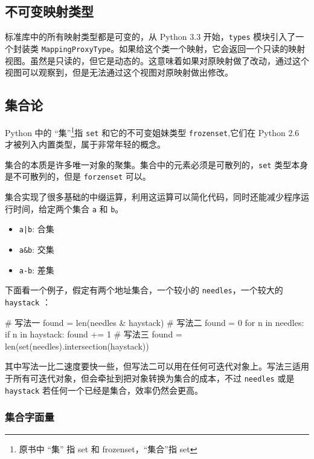 \subsection{不可变映射类型}

标准库中的所有映射类型都是可变的，从 Python 3.3 开始，\texttt{types} 模块引入了一个封装类 \texttt{MappingProxyType}。如果给这个类一个映射，它会返回一个只读的映射视图。虽然是只读的，但它是动态的。这意味着如果对原映射做了改动，通过这个视图可以观察到，但是无法通过这个视图对原映射做出修改。



\subsection{集合论}

Python 中的 ``集''\footnote{原书中 ``集'' 指 set 和 frozenset，``集合''指 set}指 \texttt{set} 和它的不可变姐妹类型 \texttt{frozenset},它们在 Python 2.6 才被列入内置类型，属于非常年轻的概念。

集合的本质是许多唯一对象的聚集。集合中的元素必须是可散列的，\texttt{set} 类型本身是不可散列的，但是 \texttt{forzenset} 可以。

集合实现了很多基础的中缀运算，利用这运算可以简化代码，同时还能减少程序运行时间，给定两个集合 \texttt{a} 和 \texttt{b}。
\begin{itemize}
    \item \texttt{a|b}: 合集
    \item \texttt{a\&b}: 交集
    \item \texttt{a-b}: 差集
\end{itemize}

下面看一个例子，假定有两个地址集合，一个较小的 \texttt{needles}，一个较大的 \texttt{haystack} ：
\begin{python}
# 写法一
found = len(needles & haystack)
# 写法二
found = 0
for n in needles:
    if n in haystack:
        found += 1
# 写法三
found = len(set(needles).intersection(haystack))
\end{python}

其中写法一比二速度要快一些，但写法二可以用在任何可迭代对象上。写法三适用于所有可迭代对象，但会牵扯到把对象转换为集合的成本，不过 \texttt{needles} 或是 \texttt{haystack} 若任何一个已经是集合，效率仍然会更高。

\subsubsection{集合字面量}

